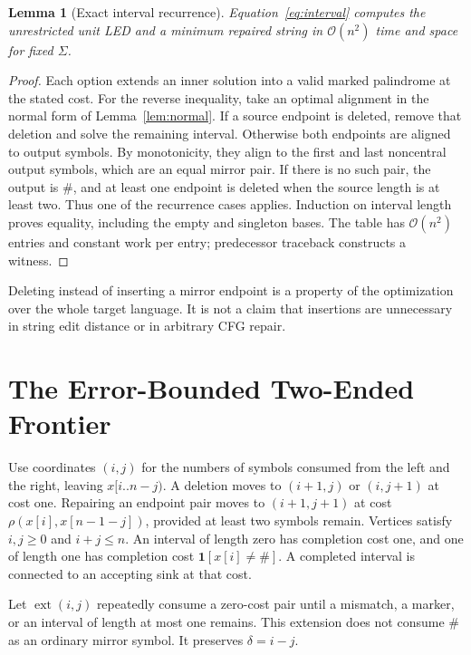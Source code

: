 \documentclass[sigconf,screen]{acmart}
\newcommand{\Oh}{\mathcal O}
\newcommand{\ind}[1]{\mathbf 1[#1]}
\newtheorem{lemma}[theorem]{Lemma}
\theoremstyle{definition}
\begin{document}
\begin{lemma}[Exact interval recurrence]\label{lem:interval}
Equation~\eqref{eq:interval} computes the unrestricted unit LED and a minimum repaired string in $\Oh(n^2)$ time and space for fixed $\Sigma$.
\end{lemma}
\begin{proof}
Each option extends an inner solution into a valid marked palindrome at the stated cost. For the reverse inequality, take an optimal alignment in the normal form of Lemma~\ref{lem:normal}. If a source endpoint is deleted, remove that deletion and solve the remaining interval. Otherwise both endpoints are aligned to output symbols. By monotonicity, they align to the first and last noncentral output symbols, which are an equal mirror pair. If there is no such pair, the output is $\#$, and at least one endpoint is deleted when the source length is at least two. Thus one of the recurrence cases applies. Induction on interval length proves equality, including the empty and singleton bases. The table has $\Oh(n^2)$ entries and constant work per entry; predecessor traceback constructs a witness.
\end{proof}

Deleting instead of inserting a mirror endpoint is a property of the optimization over the whole target language. It is not a claim that insertions are unnecessary in string edit distance or in arbitrary CFG repair.

\section{The Error-Bounded Two-Ended Frontier}\label{sec:algorithm}
Use coordinates $(i,j)$ for the numbers of symbols consumed from the left and the right, leaving $x[i..n-j)$. A deletion moves to $(i+1,j)$ or $(i,j+1)$ at cost one. Repairing an endpoint pair moves to $(i+1,j+1)$ at cost $\rho(x[i],x[n-1-j])$, provided at least two symbols remain. Vertices satisfy $i,j\ge0$ and $i+j\le n$. An interval of length zero has completion cost one, and one of length one has completion cost $\ind{x[i]\ne\#}$. A completed interval is connected to an accepting sink at that cost.

Let $\operatorname{ext}(i,j)$ repeatedly consume a zero-cost pair until a mismatch, a marker, or an interval of length at most one remains. This extension does not consume $\#$ as an ordinary mirror symbol. It preserves $\delta=i-j$.
\end{document}
